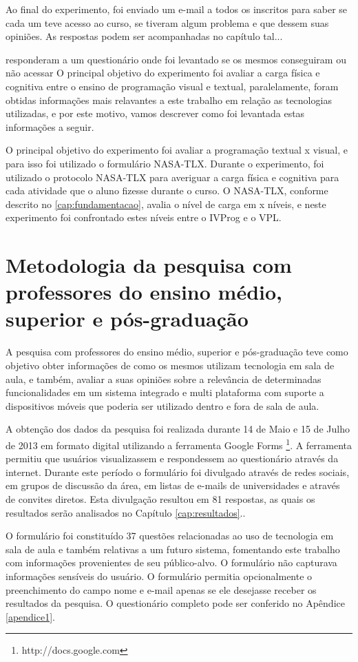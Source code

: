 Ao final do experimento, foi enviado um e-mail a todos os inscritos para saber se cada um teve acesso ao curso, se tiveram algum problema e que dessem suas opiniões. As respostas podem ser acompanhadas no capítulo tal...


responderam a um questionário onde foi levantado se os mesmos conseguiram ou não acessar 
O principal objetivo do experimento foi avaliar a carga física e cognitiva entre o ensino de programação visual e textual, paralelamente, foram obtidas informações mais relavantes a este trabalho em relação as tecnologias utilizadas, e por este motivo, vamos descrever como foi levantada estas informações a seguir.

O principal objetivo do experimento foi avaliar a programação textual x visual, e para isso foi utilizado o formulário NASA-TLX. Durante o experimento, foi utilizado o protocolo NASA-TLX para averiguar a carga física e cognitiva para cada atividade que o aluno fizesse durante o curso. O NASA-TLX, conforme descrito no \ref{cap:fundamentacao}, avalia o nível de carga em x níveis, e neste experimento foi confrontado estes níveis entre o IVProg e o VPL. 

\section{Metodologia da pesquisa com professores do ensino médio, superior e pós-graduação}

A pesquisa com professores do ensino médio, superior e pós-graduação teve como objetivo obter informações de como os mesmos utilizam tecnologia em sala de aula, e também, avaliar a suas opiniões sobre a relevância de determinadas funcionalidades em um sistema integrado e multi plataforma com suporte a dispositivos móveis que poderia ser utilizado dentro e fora de sala de aula.

A obtenção dos dados da pesquisa foi realizada durante 14 de Maio e 15 de Julho de 2013 em formato digital utilizando a ferramenta Google Forms \footnote{http://docs.google.com}. A ferramenta permitiu que usuários visualizassem e respondessem ao questionário através da internet. Durante este período o formulário foi divulgado através de redes sociais, em grupos de discussão da área, em listas de e-mails de universidades e através de convites diretos. Esta divulgação resultou em 81 respostas, as quais os resultados serão analisados no Capítulo \ref{cap:resultados}..

O formulário foi constituído 37 questões relacionadas ao uso de tecnologia em sala de aula e também relativas a um futuro sistema, fomentando este trabalho com informações provenientes de seu público-alvo. O formulário não capturava informações sensíveis do usuário. O formulário permitia opcionalmente o preenchimento do campo nome e e-mail apenas se ele desejasse receber os resultados da pesquisa. O questionário completo pode ser conferido no Apêndice \ref{apendice1}.

